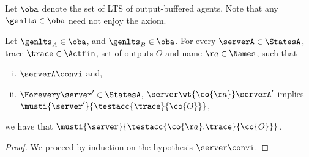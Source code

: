 {Let $\oba$ denote the set of LTS of output-buffered agents. Note that any $\genlts \in \oba$ need not enjoy the \outputfeedback axiom.






\begin{lemma}{\label{lem:aft-output-must-gen-acc}}
  Let $\genlts_A \in \oba$, and
  $\genlts_B \in \oba$.
  For every $\serverA \in \StatesA$, trace $\trace \in \Actfin$,
  set of outputs $O$ and name $\aa \in \Names$,
  such that
  \begin{enumerate}[(i)]
  \item
    \label{aft-output-must-gen-acc-h-1}
    $\serverA \convi$ and,
  \item
    \label{aft-output-must-gen-acc-h-2}
    $\Forevery \server' \in \StatesA$, $\server \wt{\co{\aa}} \serverA'$ implies
    $\musti{\server'}{\testacc{\trace}{ \co{O} }}$,
  \end{enumerate}
  we have that $\musti{\server}{\testacc{\co{\aa}.\trace}{ \co{O} }}$.
\end{lemma}
\begin{proof}
  We proceed by induction on the hypothesis $\server \convi$.


\end{proof}}

